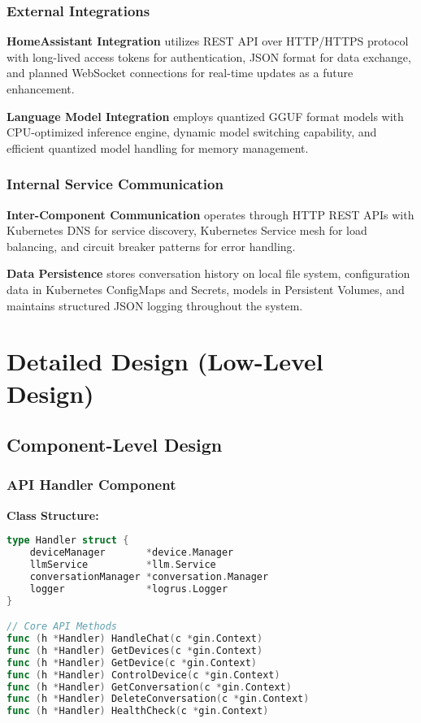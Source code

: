 \documentclass[12pt]{article}
\begin{document}
\subsubsection{External Integrations}

\textbf{HomeAssistant Integration} utilizes REST API over HTTP/HTTPS protocol with long-lived access tokens for authentication, JSON format for data exchange, and planned WebSocket connections for real-time updates as a future enhancement.

\textbf{Language Model Integration} employs quantized GGUF format models with CPU-optimized inference engine, dynamic model switching capability, and efficient quantized model handling for memory management.

\subsubsection{Internal Service Communication}

\textbf{Inter-Component Communication} operates through HTTP REST APIs with Kubernetes DNS for service discovery, Kubernetes Service mesh for load balancing, and circuit breaker patterns for error handling.

\textbf{Data Persistence} stores conversation history on local file system, configuration data in Kubernetes ConfigMaps and Secrets, models in Persistent Volumes, and maintains structured JSON logging throughout the system.

\section{Detailed Design (Low-Level Design)}

\subsection{Component-Level Design}

\subsubsection{API Handler Component}

\textbf{Class Structure:}
\begin{lstlisting}[language=Go, caption=API Handler Structure]
type Handler struct {
    deviceManager       *device.Manager
    llmService          *llm.Service
    conversationManager *conversation.Manager
    logger              *logrus.Logger
}

// Core API Methods
func (h *Handler) HandleChat(c *gin.Context)
func (h *Handler) GetDevices(c *gin.Context)
func (h *Handler) GetDevice(c *gin.Context)
func (h *Handler) ControlDevice(c *gin.Context)
func (h *Handler) GetConversation(c *gin.Context)
func (h *Handler) DeleteConversation(c *gin.Context)
func (h *Handler) HealthCheck(c *gin.Context)
\end{lstlisting}
\end{document}
